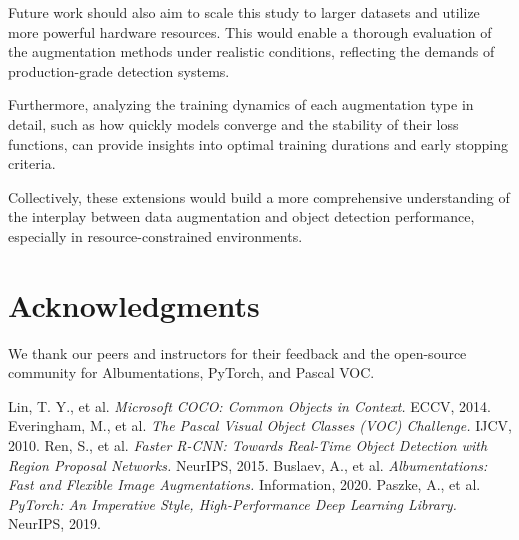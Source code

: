 \documentclass[12pt]{article}
\begin{document}
Future work should also aim to scale this study to larger datasets and utilize more powerful hardware resources. This would enable a thorough evaluation of the augmentation methods under realistic conditions, reflecting the demands of production-grade detection systems.

Furthermore, analyzing the training dynamics of each augmentation type in detail, such as how quickly models converge and the stability of their loss functions, can provide insights into optimal training durations and early stopping criteria.

Collectively, these extensions would build a more comprehensive understanding of the interplay between data augmentation and object detection performance, especially in resource-constrained environments.

\section*{Acknowledgments}
We thank our peers and instructors for their feedback and the open-source community for Albumentations, PyTorch, and Pascal VOC.

\begin{thebibliography}{9}
 Lin, T. Y., et al. \textit{Microsoft COCO: Common Objects in Context.} ECCV, 2014.
 Everingham, M., et al. \textit{The Pascal Visual Object Classes (VOC) Challenge.} IJCV, 2010.
 Ren, S., et al. \textit{Faster R-CNN: Towards Real-Time Object Detection with Region Proposal Networks.} NeurIPS, 2015.
 Buslaev, A., et al. \textit{Albumentations: Fast and Flexible Image Augmentations.} Information, 2020.
 Paszke, A., et al. \textit{PyTorch: An Imperative Style, High-Performance Deep Learning Library.} NeurIPS, 2019.
\end{thebibliography}
\end{document}
